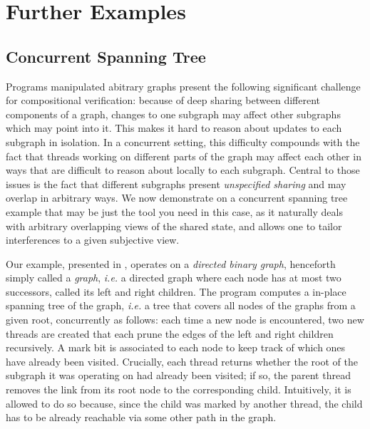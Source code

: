 \section{Further Examples}\label{sec:examples}

\subsection{Concurrent Spanning Tree}\label{subsec:CSTExample}

Programs manipulated abitrary graphs present the following significant
challenge for compositional verification: because of deep sharing
between different components of a graph, changes to one subgraph may
affect other subgraphs which may point into it. This makes it hard to
reason about updates to each subgraph in isolation. In a concurrent
setting, this difficulty compounds with the fact that threads working
on different parts of the graph may affect each other in ways that are
difficult to reason about locally to each subgraph. Central to those
issues is the fact that different subgraphs present \emph{unspecified
  sharing} and may overlap in arbitrary ways. We now demonstrate on a
concurrent spanning tree example that \colosl may be just the tool you
need in this case, as it naturally deals with arbitrary overlapping
views of the shared state, and allows one to tailor interferences to a
given subjective view.

Our example, presented in , operates on a
\emph{directed binary graph}, henceforth simply called a \emph{graph},
\textit{i.e.} a directed graph where each node has at most two
successors, called its left and right children. The program computes a
in-place spanning tree of the graph, \textit{i.e.} a tree that covers
all nodes of the graphs from a given root, concurrently as follows:
each time a new node is encountered, two new threads are created that
each prune the edges of the left and right children recursively. A
mark bit is associated to each node to keep track of which ones have
already been visited. Crucially, each thread returns whether the root
of the subgraph it was operating on had already been visited; if so,
the parent thread removes the link from its root node to the
corresponding child. Intuitively, it is allowed to do so because,
since the child was marked by another thread, the child has to be
already reachable via some other path in the graph.


